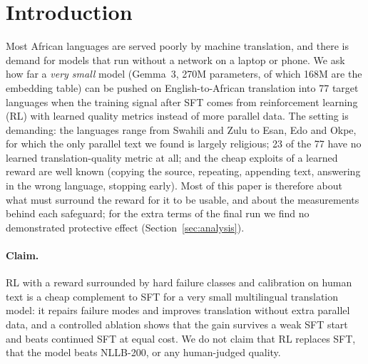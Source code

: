 \section{Introduction}
Most African languages are served poorly by machine translation, and there is demand for models that run without a network on a laptop or phone.
We ask how far a \emph{very small} model (Gemma~3, 270M parameters, of which 168M are the embedding table) can be pushed on English-to-African translation into 77 target languages when the training signal after SFT comes from reinforcement learning (RL) with learned quality metrics instead of more parallel data.
The setting is demanding: the languages range from Swahili and Zulu to Esan, Edo and Okpe, for which the only parallel text we found is largely religious; 23 of the 77 have no learned translation-quality metric at all; and the cheap exploits of a learned reward are well known (copying the source, repeating, appending text, answering in the wrong language, stopping early).
Most of this paper is therefore about what must surround the reward for it to be usable, and about the measurements behind each safeguard; for the extra terms of the final run we find no demonstrated protective effect (Section~\ref{sec:analysis}).

\paragraph{Claim.} RL with a reward surrounded by hard failure classes and calibration on human text is a cheap complement to SFT for a very small multilingual translation model: it repairs failure modes and improves translation without extra parallel data, and a controlled ablation shows that the gain survives a weak SFT start and beats continued SFT at equal cost. We do not claim that RL replaces SFT, that the model beats NLLB-200, or any human-judged quality.

